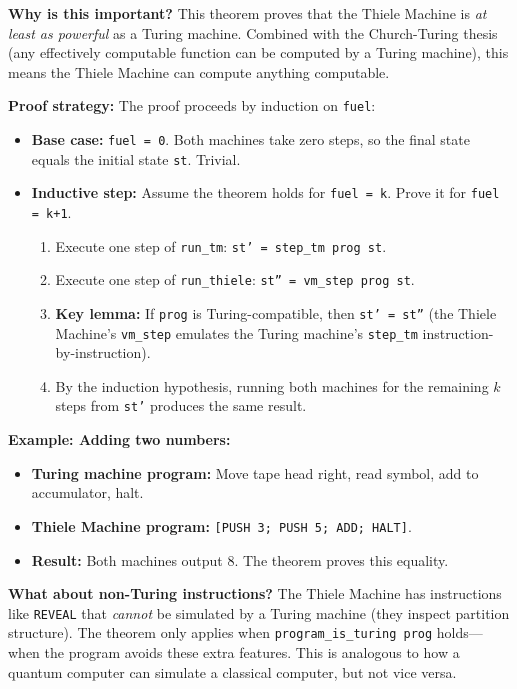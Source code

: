 \textbf{Why is this important?} This theorem proves that the Thiele Machine is \textit{at least as powerful} as a Turing machine. Combined with the Church-Turing thesis (any effectively computable function can be computed by a Turing machine), this means the Thiele Machine can compute anything computable.

\textbf{Proof strategy:} The proof proceeds by induction on \texttt{fuel}:
\begin{itemize}
    \item \textbf{Base case:} \texttt{fuel = 0}. Both machines take zero steps, so the final state equals the initial state \texttt{st}. Trivial.
    
    \item \textbf{Inductive step:} Assume the theorem holds for \texttt{fuel = k}. Prove it for \texttt{fuel = k+1}.
    \begin{enumerate}
        \item Execute one step of \texttt{run\_tm}: \texttt{st' = step\_tm prog st}.
        \item Execute one step of \texttt{run\_thiele}: \texttt{st'' = vm\_step prog st}.
        \item \textbf{Key lemma:} If \texttt{prog} is Turing-compatible, then \texttt{st' = st''} (the Thiele Machine's \texttt{vm\_step} emulates the Turing machine's \texttt{step\_tm} instruction-by-instruction).
        \item By the induction hypothesis, running both machines for the remaining $k$ steps from \texttt{st'} produces the same result.
    \end{enumerate}
\end{itemize}

\textbf{Example: Adding two numbers:}
\begin{itemize}
    \item \textbf{Turing machine program:} Move tape head right, read symbol, add to accumulator, halt.
    \item \textbf{Thiele Machine program:} \texttt{[PUSH 3; PUSH 5; ADD; HALT]}.
    \item \textbf{Result:} Both machines output 8. The theorem proves this equality.
\end{itemize}

\textbf{What about non-Turing instructions?} The Thiele Machine has instructions like \texttt{REVEAL} that \textit{cannot} be simulated by a Turing machine (they inspect partition structure). The theorem only applies when \texttt{program\_is\_turing prog} holds---when the program avoids these extra features. This is analogous to how a quantum computer can simulate a classical computer, but not vice versa.

